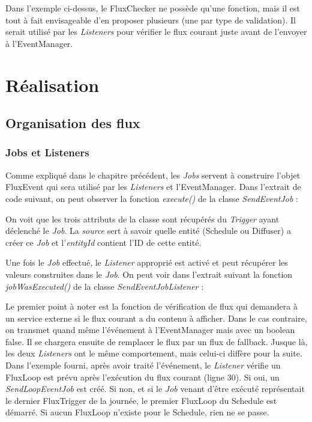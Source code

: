 \documentclass[french]{article}
\begin{document}
Dans l'exemple ci-dessus, le FluxChecker ne possède qu'une fonction, mais il est tout à fait envisageable d'en proposer plusieurs (une par type de validation). Il serait utilisé par les \textit{Listeners} pour vérifier le flux courant juste avant de l'envoyer à l'EventManager.

\newpage	
\section{Réalisation}

\subsection{Organisation des flux}


\subsubsection{Jobs et Listeners}

Comme expliqué dans le chapitre précédent, les \textit{Jobs} servent à construire l'objet FluxEvent qui sera utilisé par les \textit{Listeners} et l'EventManager. Dans l'extrait de code suivant, on peut observer la fonction \textit{execute()} de la classe \textit{SendEventJob} : 



On voit que les trois attributs de la classe sont récupérés du \textit{Trigger} ayant déclenché le \textit{Job}. La \textit{source} sert à savoir quelle entité (Schedule ou Diffuser) a créer ce \textit{Job} et l'\textit{entityId} contient l'ID de cette entité.\newline

Une fois le \textit{Job} effectué, le \textit{Listener} approprié est activé et peut récupérer les valeurs construites dans le \textit{Job}. On peut voir dans l'extrait suivant la fonction \textit{jobWasExecuted()} de la classe \textit{SendEventJobListener} : 



Le premier point à noter est la fonction de vérification de flux qui demandera à un service externe si le flux courant a du contenu à afficher. Dans le cas contraire, on transmet quand même l'événement à l'EventManager mais avec un boolean false. Il se chargera ensuite de remplacer le flux par un flux de fallback. \newline
Jusque là, les deux \textit{Listeners} ont le même comportement, mais celui-ci diffère pour la suite. Dans l'exemple fourni, après avoir traité l'événement, le \textit{Listener} vérifie un FluxLoop est prévu après l'exécution du flux courant (ligne 30). Si oui, un \textit{SendLoopEventJob} est créé. Si non, et si le \textit{Job} venant d'être exécuté représentait le dernier FluxTrigger de la journée, le premier FluxLoop du Schedule est démarré. Si aucun FluxLoop n'existe pour le Schedule, rien ne se passe.
\end{document}
